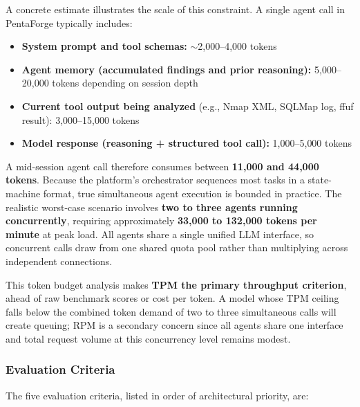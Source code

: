 \documentclass[12pt,a4paper]{report}
\begin{document}
A concrete estimate illustrates the scale of this constraint. A single agent call
in PentaForge typically includes:

\begin{itemize}
    \item \textbf{System prompt and tool schemas:} $\sim$2{,}000--4{,}000 tokens
    \item \textbf{Agent memory (accumulated findings and prior reasoning):}
    5{,}000--20{,}000 tokens depending on session depth
    \item \textbf{Current tool output being analyzed} (e.g., Nmap XML, SQLMap log,
    ffuf result): 3{,}000--15{,}000 tokens
    \item \textbf{Model response (reasoning + structured tool call):}
    1{,}000--5{,}000 tokens
\end{itemize}

A mid-session agent call therefore consumes between \textbf{11{,}000 and 44{,}000
tokens}. Because the platform's orchestrator sequences most tasks in a state-machine
format, true simultaneous agent execution is bounded in practice. The realistic
worst-case scenario involves \textbf{two to three agents running concurrently},
requiring approximately \textbf{33{,}000 to 132{,}000 tokens per minute} at peak
load. All agents share a single unified LLM interface, so concurrent calls draw
from one shared quota pool rather than multiplying across independent connections.

This token budget analysis makes \textbf{TPM the primary throughput criterion},
ahead of raw benchmark scores or cost per token. A model whose TPM ceiling falls
below the combined token demand of two to three simultaneous calls will create
queuing; RPM is a secondary concern since all agents share one interface and total
request volume at this concurrency level remains modest.

\subsubsection{Evaluation Criteria}

The five evaluation criteria, listed in order of architectural priority, are:
\end{document}
